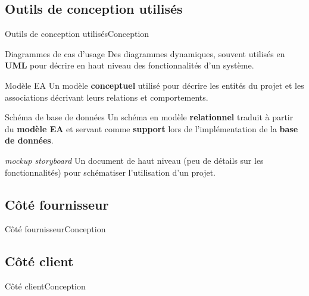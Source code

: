 \documentclass{beamer}
\begin{document}
\subsection{Outils de conception utilisés}
\begin{frame}{Outils de conception utilisés}{Conception}
\begin{block}{Diagrammes de cas d'usage}
Des diagrammes dynamiques, souvent utilisés en \textbf{UML} pour décrire en haut niveau des fonctionnalités d'un système.
\end{block}

\begin{block}{Modèle EA}
Un modèle \textbf{conceptuel} utilisé pour décrire les entités du projet et les associations décrivant leurs relations et comportements.
\end{block}

\begin{block}{Schéma de base de données}
Un schéma en modèle \textbf{relationnel} traduit à partir du \textbf{modèle EA} et servant comme \textbf{support} lors de l'implémentation de la \textbf{base de données}.
\end{block}

\begin{block}{\textit{mockup storyboard}}
Un document de haut niveau (peu de détails sur les fonctionnalités) pour schématiser l'utilisation d'un projet.
\end{block}
\end{frame}

\subsection{Côté fournisseur}
\begin{frame}{Côté fournisseur}{Conception}
\end{frame}

\subsection{Côté client}
\begin{frame}{Côté client}{Conception}
\end{frame}
\end{document}
